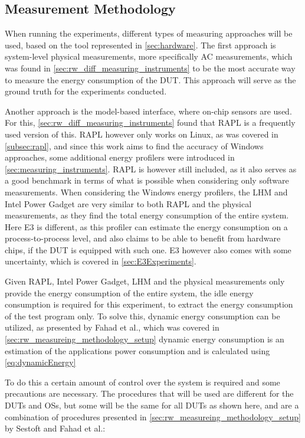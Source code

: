 \subsection{Measurement Methodology}

When running the experiments, different types of measuring approaches will be used, based on the tool represented in \cref{sec:hardware}. The first approach is system-level physical measurements, more specifically AC measurements, which was found in \cref{sec:rw_diff_measuring_instruments} to be the most accurate way to measure the energy consumption of the DUT. This approach will serve as the ground truth for the experiments conducted.

Another approach is the model-based interface, where on-chip sensors are used. For this, \cref{sec:rw_diff_measuring_instruments} found that RAPL is a frequently used version of this. RAPL however only works on Linux, as was covered in \cref{subsec:rapl}, and since this work aims to find the accuracy of Windows approaches, some additional energy profilers were introduced in \cref{sec:measuring_instruments}. RAPL is however still included, as it also serves as a good benchmark in terms of what is possible when considering only software measurements. When considering the Windows energy profilers, the LHM and Intel Power Gadget are very similar to both RAPL and the physical measurements, as they find the total energy consumption of the entire system. Here E3 is different, as this profiler can estimate the energy consumption on a process-to-process level, and also claims to be able to benefit from hardware chips, if the DUT is equipped with such one.\cite{E3WinHec} E3 however also comes with some uncertainty, which is covered in \cref{sec:E3Experiments}.

Given RAPL, Intel Power Gadget, LHM and the physical measurements only provide the energy consumption of the entire system, the idle energy consumption is required for this experiment, to extract the energy consumption of the test program only. To solve this, dynamic energy consumption can be utilized, as presented by Fahad et al.\cite{fahad2019comparative}, which was covered in \cref{sec:rw_measureing_methodology_setup} dynamic energy consumption is an estimation of the applications power consumption and is calculated using \cref{eq:dynamicEnergy}

To do this a certain amount of control over the system is required and some precautions are necessary. The procedures that will be used are different for the DUTs and OSs, but some will be the same for all DUTs as shown here, and are a combination of procedures presented in \cref{sec:rw_measureing_methodology_setup} by Sestoft\cite[]{sestoft2013microbenchmarks} and Fahad et al.\cite[]{fahad2019comparative}:

